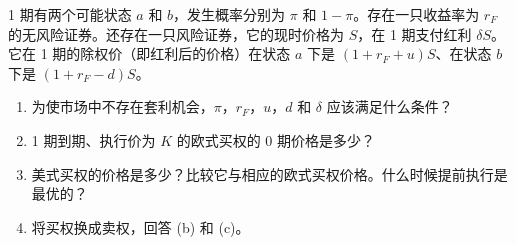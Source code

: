 
\begin{problem}
 1 期有两个可能状态 $a$ 和 $b$，发生概率分别为 $\pi$ 和 $1-\pi$。存在一只收益率为 $r_{F}$ 的无风险证券。还存在一只风险证券，它的现时价格为 $S$，在 1 期支付红利 $\delta S$。它在 1 期的除权价（即红利后的价格）在状态 $a$ 下是 $(1+r_{F}+u)S$、在状态 $b$ 下是 $(1+r_{F}-d)S$。
\begin{enumerate}[label=(\alph*)]
    \item 为使市场中不存在套利机会，$\pi$，$r_{F}$，$u$，$d$ 和 $\delta$ 应该满足什么条件？
    \item 1 期到期、执行价为 $K$ 的欧式买权的 0 期价格是多少？
    \item 美式买权的价格是多少？比较它与相应的欧式买权价格。什么时候提前执行是最优的？
    \item 将买权换成卖权，回答 (b) 和 (c)。
\end{enumerate}
\end{problem}
